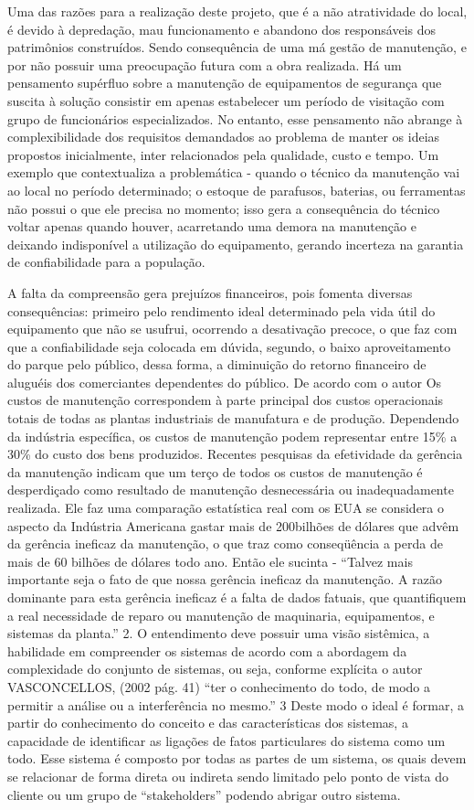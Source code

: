 	Uma das razões para a realização deste projeto, que é a não atratividade do local, é devido à depredação, mau funcionamento e abandono dos responsáveis dos patrimônios construídos. Sendo consequência de uma má gestão de manutenção, e por não possuir uma preocupação futura com a obra realizada. Há um pensamento supérfluo sobre a manutenção de equipamentos de segurança que suscita à solução consistir em apenas estabelecer um período de visitação com grupo de funcionários especializados. No entanto, esse pensamento não abrange à complexibilidade dos requisitos demandados ao problema de manter os ideias propostos inicialmente, inter relacionados pela qualidade, custo e tempo. Um exemplo que contextualiza a problemática - quando o técnico da manutenção vai ao local no período determinado; o estoque de parafusos, baterias, ou ferramentas não possui o que ele precisa no momento; isso gera a consequência do técnico voltar apenas quando houver, acarretando uma demora na manutenção e deixando indisponível a utilização do equipamento, gerando incerteza na garantia de confiabilidade para a população.

	A falta da compreensão gera prejuízos financeiros, pois fomenta diversas consequências: primeiro pelo rendimento ideal determinado pela vida útil do equipamento que não se usufrui, ocorrendo a desativação precoce, o que faz com que a confiabilidade seja colocada em dúvida, segundo, o baixo aproveitamento do parque pelo público, dessa forma, a diminuição do retorno financeiro de aluguéis dos comerciantes dependentes do público. De acordo com o autor  Os custos de manutenção correspondem à parte principal dos custos operacionais totais de todas as plantas industriais de manufatura e de produção. Dependendo da indústria específica, os custos de manutenção podem representar entre 15\% a 30\% do custo dos bens produzidos. Recentes pesquisas da efetividade da gerência da manutenção indicam que um terço de todos os custos de manutenção é desperdiçado como resultado de manutenção desnecessária ou inadequadamente realizada. Ele faz uma comparação estatística real com os EUA se considera o aspecto da Indústria Americana gastar mais de 200bilhões de dólares que advêm da gerência ineficaz da manutenção, o que traz como conseqüência a perda de mais de 60 bilhões de dólares todo ano. Então ele sucinta - “Talvez mais importante seja o fato de que nossa gerência ineficaz da manutenção. A razão dominante para esta gerência ineficaz é a falta de dados fatuais, que quantifiquem a real necessidade de reparo ou manutenção de maquinaria, equipamentos, e sistemas da planta.” 2. O entendimento deve possuir uma visão sistêmica, a habilidade em compreender os sistemas de acordo com a abordagem da complexidade do conjunto de sistemas, ou seja, conforme explícita o autor VASCONCELLOS, (2002 pág. 41) “ter o conhecimento do todo, de modo a permitir a análise ou a interferência no mesmo.” 3 Deste modo o ideal é formar, a partir do conhecimento do conceito e das características dos sistemas, a capacidade de identificar as ligações de fatos particulares do sistema como um todo. Esse sistema é composto por todas as partes de um sistema, os quais devem se relacionar de forma direta ou indireta sendo limitado pelo ponto de vista do cliente ou um grupo de “stakeholders” podendo abrigar outro sistema.
	
